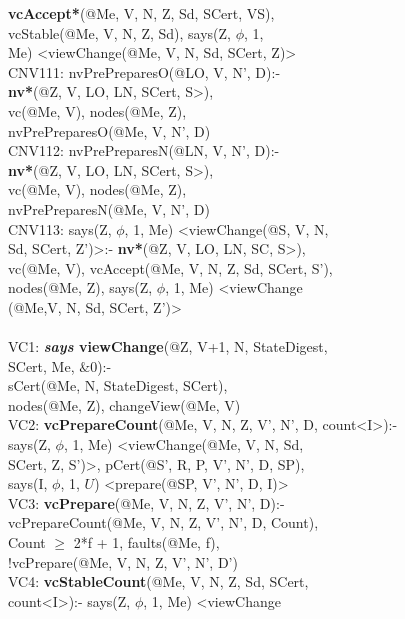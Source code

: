 \begin{code}
\> \textbf{vcAccept*}(@Me, V, N, Z, Sd, SCert, VS),\\
\> vcStable(@Me, V, N, Z, Sd), says(Z, $\phi$, 1, \\
\> Me) <viewChange(@Me, V, N, Sd, SCert, Z)>\\
CNV111: nvPrePreparesO(@LO, V, N', D):-\\
\> \textbf{nv*}(@Z, V, LO, LN, SCert, S>),\\
\> vc(@Me, V), nodes(@Me, Z), \\
\> nvPrePreparesO(@Me, V, N', D)\\
CNV112: nvPrePreparesN(@LN, V, N', D):-\\
\> \textbf{nv*}(@Z, V, LO, LN, SCert, S>),\\
\> vc(@Me, V), nodes(@Me, Z), \\
\> nvPrePreparesN(@Me, V, N', D)\\
CNV113: says(Z, $\phi$, 1, Me) <viewChange(@S, V, N, \\
\> Sd, SCert, Z')>:- \textbf{nv*}(@Z, V, LO, LN, SC, S>),\\
\> vc(@Me, V), vcAccept(@Me, V, N, Z, Sd, SCert, S'),\\
\> nodes(@Me, Z), says(Z, $\phi$, 1, Me) <viewChange \\
\> (@Me,V, N, Sd, SCert, Z')>\\
\\
VC1: \textbf{\textit{says} viewChange}(@Z, V+1, N, StateDigest, \\
\> SCert, Me, $\&0$):- \\
\> sCert(@Me, N, StateDigest, SCert), \\
\> nodes(@Me, Z), changeView(@Me, V)\\
VC2: \textbf{vcPrepareCount}(@Me, V, N, Z, V', N', D, count<I>):-\\
\> says(Z, $\phi$, 1, Me) <viewChange(@Me, V, N, Sd,  \\
\> SCert, Z, S')>, pCert(@S', R, P, V', N', D, SP),\\
\> says(I, $\phi$, 1, $U$) <prepare(@SP, V', N', D, I)>\\
VC3: \textbf{vcPrepare}(@Me, V, N, Z, V', N', D):-\\
\> vcPrepareCount(@Me, V, N, Z, V', N', D, Count),\\
\> Count $\geq$ 2*f + 1, faults(@Me, f),\\
\> !vcPrepare(@Me, V, N, Z, V', N', D')\\
VC4: \textbf{vcStableCount}(@Me, V, N, Z, Sd, SCert, \\
\> count<I>):- says(Z, $\phi$, 1, Me) <viewChange\\

\end{code}
